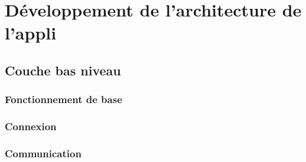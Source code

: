 \documentclass[a4paper,10pt]{report}
\begin{document}
    
\chapter{Développement de l'architecture de l'appli}
  \paragraph{}
  \section{Couche bas niveau}
  
    \subsection{Fonctionnement de base}
    \subsection{Connexion}
    \subsection{Communication}
\end{document}
